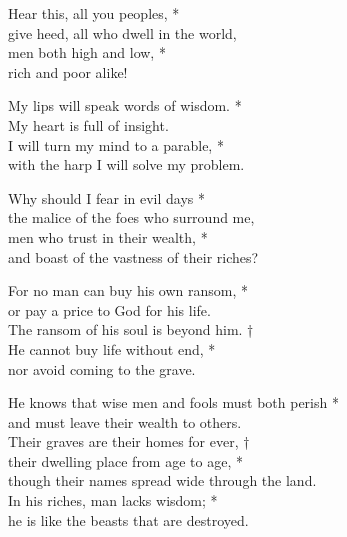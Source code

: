 Hear this, all you peoples, *\\
give heed, all who dwell in the world,\\
men both high and low, *\\
rich and poor alike!

My lips will speak words of wisdom. *\\
My heart is full of insight.\\
I will turn my mind to a parable, *\\
with the harp I will solve my problem.

Why should I fear in evil days *\\
the malice of the foes who surround me,\\
men who trust in their wealth, *\\
and boast of the vastness of their riches?

For no man can buy his own ransom, *\\
or pay a price to God for his life.\\
The ransom of his soul is beyond him. †\\
He cannot buy life without end, *\\
nor avoid coming to the grave.

He knows that wise men and fools must both perish *\\
and must leave their wealth to others.\\
Their graves are their homes for ever, †\\
their dwelling place from age to age, *\\
though their names spread wide through the land.\\

In his riches, man lacks wisdom; *\\
he is like the beasts that are destroyed.

